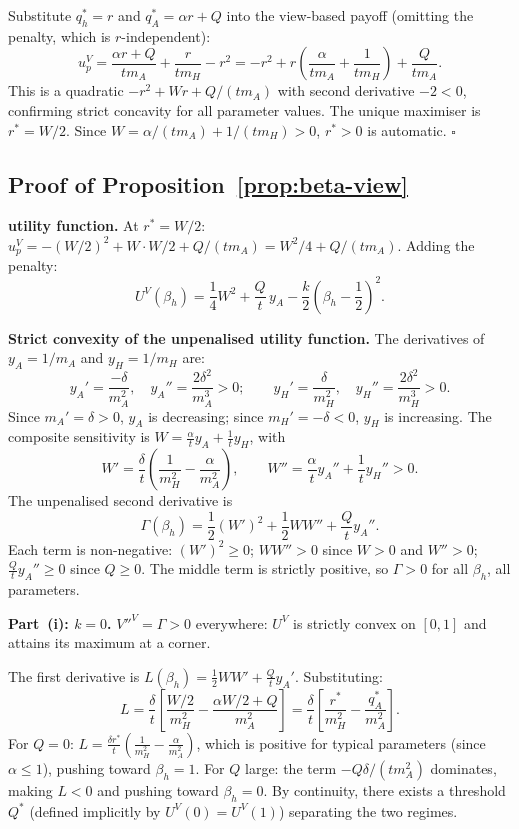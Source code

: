\documentclass[mnsc,nonblindrev]{informs3_NoOR}
\begin{document}
Substitute $q_h^* = r$ and $q_A^* = \alpha r + Q$ into the view-based payoff (omitting the penalty, which is $r$-independent):
\[
u_p^V = \frac{\alpha r + Q}{tm_A} + \frac{r}{tm_H} - r^2 = -r^2 + r\!\left(\frac{\alpha}{tm_A} + \frac{1}{tm_H}\right) + \frac{Q}{tm_A}.
\]
This is a quadratic $-r^2 + Wr + Q/(tm_A)$ with second derivative $-2 < 0$, confirming strict concavity for all parameter values. The unique maximiser is $r^* = W/2$. Since $W = \alpha/(tm_A) + 1/(tm_H) > 0$, $r^* > 0$ is automatic. \hfill$\square$
 
\subsection*{Proof of Proposition~\ref{prop:beta-view}}
 
\noindent\textbf{utility function.}
At $r^* = W/2$: $u_p^V = -(W/2)^2 + W \cdot W/2 + Q/(tm_A) = W^2/4 + Q/(tm_A)$. Adding the penalty:
\[
U^V(\beta_h) = \frac{1}{4}W^2 + \frac{Q}{t}\,y_A - \frac{k}{2}\!\left(\beta_h - \frac{1}{2}\right)^{\!2}.
\]
 
\medskip\noindent\textbf{Strict convexity of the unpenalised utility function.}
The derivatives of $y_A = 1/m_A$ and $y_H = 1/m_H$ are:
\[
y_A' = \frac{-\delta}{m_A^2},\quad y_A'' = \frac{2\delta^2}{m_A^3} > 0; \qquad y_H' = \frac{\delta}{m_H^2},\quad y_H'' = \frac{2\delta^2}{m_H^3} > 0.
\]
Since $m_A' = \delta > 0$, $y_A$ is decreasing; since $m_H' = -\delta < 0$, $y_H$ is increasing. The composite sensitivity is $W = \frac{\alpha}{t}y_A + \frac{1}{t}y_H$, with
\[
W' = \frac{\delta}{t}\!\left(\frac{1}{m_H^2} - \frac{\alpha}{m_A^2}\right), \qquad W'' = \frac{\alpha}{t}y_A'' + \frac{1}{t}y_H'' > 0.
\]
The unpenalised second derivative is
\[
\Gamma(\beta_h) = \frac{1}{2}(W')^2 + \frac{1}{2}WW'' + \frac{Q}{t}y_A''.
\]
Each term is non-negative: $(W')^2 \geq 0$; $WW'' > 0$ since $W > 0$ and $W'' > 0$; $\frac{Q}{t}y_A'' \geq 0$ since $Q \geq 0$. The middle term is strictly positive, so $\Gamma > 0$ for all $\beta_h$, all parameters.


 
\medskip\noindent\textbf{Part~(i): $k = 0$.}
$V''^V = \Gamma > 0$ everywhere: $U^V$ is strictly convex on $[0,1]$ and attains its maximum at a corner.
 
The first derivative is $L(\beta_h) = \frac{1}{2}WW' + \frac{Q}{t}y_A'$. Substituting:
\[
L = \frac{\delta}{t}\!\left[\frac{W/2}{m_H^2} - \frac{\alpha W/2 + Q}{m_A^2}\right] = \frac{\delta}{t}\!\left[\frac{r^*}{m_H^2} - \frac{q_A^*}{m_A^2}\right].
\]
For $Q = 0$: $L = \frac{\delta r^*}{t}\!\left(\frac{1}{m_H^2} - \frac{\alpha}{m_A^2}\right)$, which is positive for typical parameters (since $\alpha \leq 1$), pushing toward $\beta_h = 1$. For $Q$ large: the term $-Q\delta/(tm_A^2)$ dominates, making $L < 0$ and pushing toward $\beta_h = 0$. By continuity, there exists a threshold $Q^*$ (defined implicitly by $U^V(0) = U^V(1)$) separating the two regimes.
\end{document}
